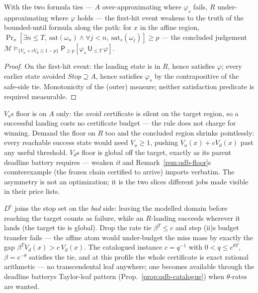 \begin{bprop}\label{prop:qutb-sound}
With the two formula ties --- $A$ over-approximating where $\varphi_s$
fails, $R$ under-approximating where $\varphi$ holds --- the first-hit
event weakens to the truth of the bounded-until formula along the path:
for $x$ in the affine region,
$\Pr_x[\exists n \le T,\ \mathrm{sat}(\omega_n) \wedge
\forall j < n,\ \mathrm{sat}_s(\omega_j)] \ge p$ --- the concluded
judgement
$\mathcal{M} \vDash_{\{V_a + c V_d \le 1-p\}}
\mathsf{P}_{\ge p}[\varphi_s\,\mathsf{U}_{\le T}\,\varphi]$.
\end{bprop}
\begin{proof}
On the first-hit event: the landing state is in $R$, hence satisfies
$\varphi$; every earlier state avoided $\mathit{Stop} \supseteq A$,
hence satisfies $\varphi_s$ by the contrapositive of the safe-side tie.
Monotonicity of the (outer) measure; neither satisfaction predicate is
required measurable.
\end{proof}

\begin{bremark}\label{rem:qutb-floors}
$V_a$\textquotesingle s floor is on $A$ only: the avoid certificate is
silent on the target region, so a successful landing costs no
certificate budget --- the rule does not charge for winning. Demand the
floor on $R$ too and the concluded region shrinks pointlessly: every
reachable success state would need $V_a \ge 1$, pushing
$V_a(x) + c V_d(x)$ past any useful threshold. $V_d$\textquotesingle s
floor is global off the target, exactly as its parent deadline battery
requires --- weaken \emph{it} and Remark~\ref{rem:qdb-floor}\textquotesingle s
counterexample (the frozen chain certified to arrive) imports verbatim.
The asymmetry is not an optimization; it is the two
slices\textquotesingle{} different jobs made visible in their price
lists.
\end{bremark}

\begin{bremark}\label{rem:qutb-failclosed}
$D^{\mathrm{c}}$ joins the stop set on the \emph{bad} side: leaving the
modelled domain before reaching the target counts as failure, while an
$R$-landing succeeds wherever it lands (the target tie is global). Drop
the rate tie $\beta^{T} \le c$ and step (ii)\textquotesingle s budget
transfer fails --- the affine atom would under-budget the miss mass by
exactly the gap $\beta^{T} V_d(x) > c\, V_d(x)$. The catalogued instance
$c = q^{-1}$ with $0 < q \le e^{\theta T}$, $\beta = e^{-\theta}$
satisfies the tie, and at this profile the whole certificate is exact rational
arithmetic --- no transcendental leaf anywhere; one becomes available
through the deadline battery\textquotesingle s Taylor-leaf pattern
(Prop.~\ref{prop:qdb-catalogue}) when $\theta$-rates are wanted.
\end{bremark}

